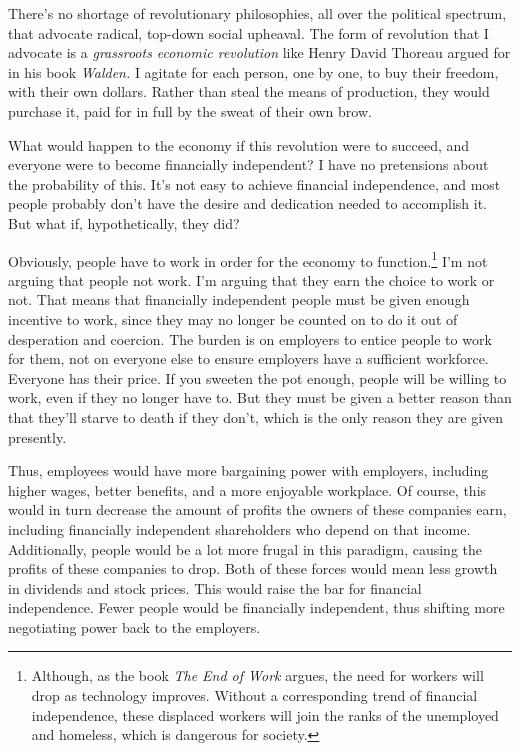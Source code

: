 There's no shortage of revolutionary philosophies, all over the political spectrum, that advocate radical, top-down social upheaval. The form of revolution that I advocate is a \emph{grassroots economic revolution} like Henry David Thoreau argued for in his book \emph{Walden.} I agitate for each person, one by one, to buy their freedom, with their own dollars. Rather than steal the means of production, they would purchase it, paid for in full by the sweat of their own brow.

What would happen to the economy if this revolution were to succeed, and everyone were to become financially independent? I have no pretensions about the probability of this. It's not easy to achieve financial independence, and most people probably don't have the desire and dedication needed to accomplish it. But what if, hypothetically, they did?

Obviously, people have to work in order for the economy to function.\footnote{Although, as the book \emph{The End of Work} argues, the need for workers will drop as technology improves. Without a corresponding trend of financial independence, these displaced workers will join the ranks of the unemployed and homeless, which is dangerous for society.} I'm not arguing that people not work. I'm arguing that they earn the choice to work or not. That means that financially independent people must be given enough incentive to work, since they may no longer be counted on to do it out of desperation and coercion. The burden is on employers to entice people to work for them, not on everyone else to ensure employers have a sufficient workforce. Everyone has their price. If you sweeten the pot enough, people will be willing to work, even if they no longer have to. But they must be given a better reason than that they'll starve to death if they don't, which is the only reason they are given presently.

Thus, employees would have more bargaining power with employers, including higher wages, better benefits, and a more enjoyable workplace. Of course, this would in turn decrease the amount of profits the owners of these companies earn, including financially independent shareholders who depend on that income. Additionally, people would be a lot more frugal in this paradigm, causing the profits of these companies to drop. Both of these forces would mean less growth in dividends and stock prices. This would raise the bar for financial independence. Fewer people would be financially independent, thus shifting more negotiating power back to the employers.

